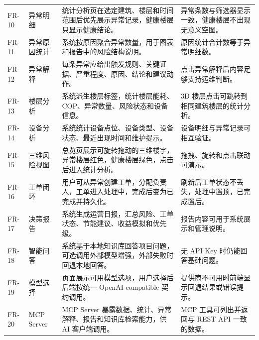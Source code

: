 \documentclass[12pt,a4paper]{ctexart}
\begin{document}
\begin{longtable}{L{1.7cm}L{2.8cm}L{6.2cm}L{4.5cm}}
FR-10 & 异常明细 & 统计分析页在选定建筑、楼层和时间范围后优先展示异常记录，健康楼层只显示健康结论。 & 异常条数与筛选器显示一致，健康楼层不出现无意义空图。 \\
FR-11 & 异常原因统计 & 系统按原因聚合异常数量，用于图表和报告中的风险结构说明。 & 原因统计合计数等于异常明细数。 \\
FR-12 & 异常解释 & 每条异常应给出触发规则、关键证据、严重程度、原因、结论和建议动作。 & 点击异常解释后内容足够支持运维判断。 \\
FR-13 & 楼层分析 & 系统派生楼层标签，统计楼层能耗、COP、异常数量、风险状态和设备信息。 & 3D 楼层点击可跳转到相同建筑楼层的统计分析。 \\
FR-14 & 设备分析 & 系统统计设备点位、设备类型、设备状态、最近出现时间和维护提示。 & 设备明细与异常记录可相互验证。 \\
FR-15 & 三维风险视图 & 总览页展示可旋转拖动的三维楼宇，异常楼层红色，健康楼层绿色，点击后进入统计分析。 & 拖拽、旋转和点击联动可演示。 \\
FR-16 & 工单闭环 & 用户可从异常创建工单，分配负责人，工单进入处理中，完成后变为已完成并持久化。 & 刷新后工单状态不丢失，处理中置顶，已完成置后。 \\
FR-17 & 决策报告 & 系统生成运营日报，汇总风险、工单状态、节能建议、收益模拟和优先级。 & 报告内容可用于系统展示和管理说明。 \\
FR-18 & 智能问答 & 系统基于本地知识库回答项目问题，可选调用外部模型增强，外部失败时回退本地回答。 & 无 API Key 时仍能回答基础问题。 \\
FR-19 & 模型选择 & 页面展示可用模型选项，用户选择后后端按统一 OpenAI-compatible 契约调用。 & 提供商不可用时前端显示回退结果或错误提示。 \\
FR-20 & MCP Server & MCP Server 暴露数据、统计、异常解释、报告和知识库检索能力，供 AI 客户端调用。 & MCP 工具可列出并返回与 REST API 一致的数据。 \\
\bottomrule
\end{longtable}
\end{document}

